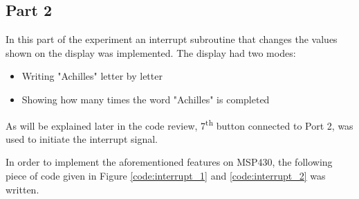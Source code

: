 \documentclass[pdftex,12pt,a4paper]{article}
\begin{document}
\newpage
\subsection{Part 2}
In this part of the experiment an interrupt subroutine that changes the values shown on the display was implemented. The display had two modes:
\begin{itemize}
    \item Writing "Achilles" letter by letter
    \item Showing how many times the word "Achilles" is completed
\end{itemize}
As will be explained later in the code review, 7\textsuperscript{th} button connected to Port 2, was used to initiate the interrupt signal.

\newline{}
In order to implement the aforementioned features on MSP430, the following piece of code given in Figure \ref{code:interrupt_1} and \ref{code:interrupt_2} was written.
\end{document}
